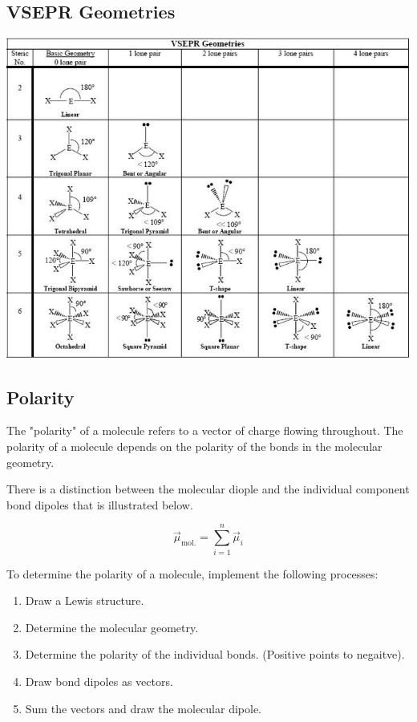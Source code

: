 \subsection{VSEPR Geometries}
\includegraphics[width=\textwidth]{resources/vsepr-table.png}

\subsection{Polarity}
The "polarity" of a molecule refers to a vector of charge flowing throughout.
The polarity of a molecule depends on the polarity of the bonds in the molecular
geometry.

There is a distinction between the molecular diople and the individual component
bond dipoles that is illustrated below.

\begin{equation}
\vec{\mu}_{\text{mol.}} = \sum_{i=1}^{n} \vec{\mu}_{i}
\end{equation}

To determine the polarity of a molecule, implement the following processes:

\begin{enumerate}
  \item Draw a Lewis structure.
  \item Determine the molecular geometry.
  \item Determine the polarity of the individual bonds. (Positive points to
    negaitve).
  \item Draw bond dipoles as vectors.
  \item Sum the vectors and draw the molecular dipole.
\end{enumerate}

